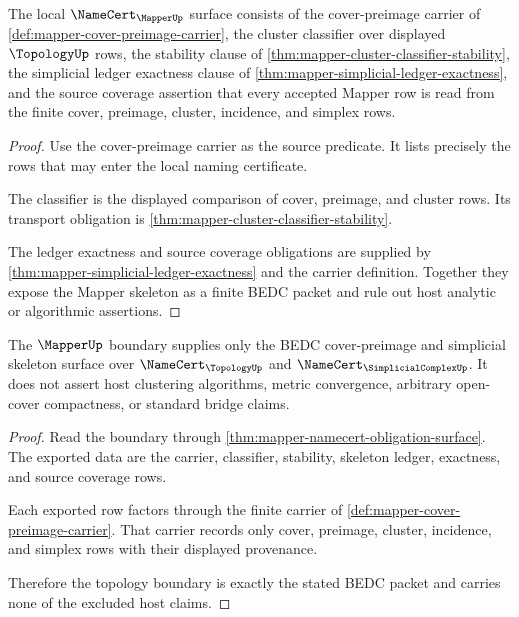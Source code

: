 \begin{theorem}
\label{thm:mapper-namecert-obligation-surface}
The local $\NameCert_{\MapperUp}$ surface consists of the cover-preimage
carrier of \autoref{def:mapper-cover-preimage-carrier}, the cluster classifier
over displayed $\TopologyUp$ rows, the stability clause of
\autoref{thm:mapper-cluster-classifier-stability}, the simplicial ledger
exactness clause of \autoref{thm:mapper-simplicial-ledger-exactness}, and the
source coverage assertion that every accepted Mapper row is read from the
finite cover, preimage, cluster, incidence, and simplex rows.
\end{theorem}
\begin{proof}
Use the cover-preimage carrier as the source predicate. It lists precisely the
rows that may enter the local naming certificate.

The classifier is the displayed comparison of cover, preimage, and cluster
rows. Its transport obligation is
\autoref{thm:mapper-cluster-classifier-stability}.

The ledger exactness and source coverage obligations are supplied by
\autoref{thm:mapper-simplicial-ledger-exactness} and the carrier definition.
Together they expose the Mapper skeleton as a finite BEDC packet and rule out
host analytic or algorithmic assertions.
\end{proof}

\begin{theorem}
\label{thm:mapper-topology-boundary-exclusions}
The $\MapperUp$ boundary supplies only the BEDC cover-preimage and simplicial
skeleton surface over $\NameCert_{\TopologyUp}$ and
$\NameCert_{\SimplicialComplexUp}$. It does not assert host clustering
algorithms, metric convergence, arbitrary open-cover compactness, or standard
bridge claims.
\end{theorem}
\begin{proof}
Read the boundary through
\autoref{thm:mapper-namecert-obligation-surface}. The exported data are the
carrier, classifier, stability, skeleton ledger, exactness, and source
coverage rows.

Each exported row factors through the finite carrier of
\autoref{def:mapper-cover-preimage-carrier}. That carrier records only cover,
preimage, cluster, incidence, and simplex rows with their displayed
provenance.

Therefore the topology boundary is exactly the stated BEDC packet and carries
none of the excluded host claims.
\end{proof}

